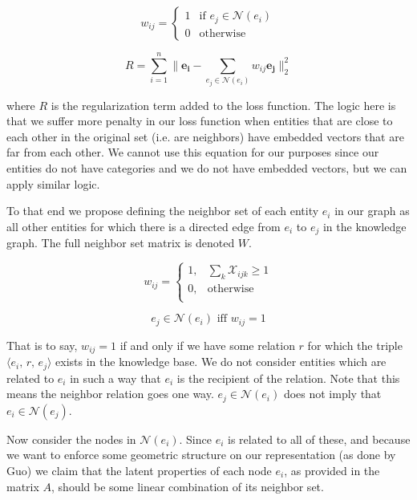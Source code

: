 \documentclass[pageno]{jpaper}
\begin{document}
$$
w_{ij} =
\begin{cases}
    1 & \text{if } e_j \in \mathcal{N}(e_i) \\
    0 & \text{otherwise}
\end{cases}
$$

$$R = \sum_{i=1}^n \lVert \mathbf{e_i} - \sum_{e_j \in \mathcal{N}(e_i)} w_{ij}
\mathbf{e_j} \rVert_2^2$$

where $R$ is the regularization term added to the loss function. The logic here
is that we suffer more penalty in our loss function when entities that are close
to each other in the original set (i.e. are neighbors) have embedded vectors
that are far from each other. We cannot use this equation for our purposes since
our entities do not have categories and we do not have embedded vectors, but we
can apply similar logic.

To that end we propose defining the neighbor set of each entity $e_i$ in our graph
as all other entities for which there is a directed edge from $e_i$ to $e_j$ in
the knowledge graph. The full neighbor set matrix is denoted $W$.

\begin{equation}
    \label{eq: new wij}
    w_{ij} =
    \begin{cases}
        1, & \sum_k \mathcal{X}_{ijk} \geq 1 \\
        0, & \text{otherwise} \\
    \end{cases}
\end{equation}

\begin{equation}
    \label{eq: new neighbor set}
    e_j \in \mathcal{N}(e_i) \text{ iff } w_{ij} = 1
\end{equation}

That is to say, $w_{ij} = 1$ if and only if we have some relation $r$ for which
the triple $\langle e_i,\,r,\,e_j \rangle$ exists in the knowledge base. We do
not consider entities which are related to $e_i$ in such a way that $e_i$ is the
recipient of the relation. Note that this means the neighbor relation goes one
way. $e_j \in \mathcal{N}(e_i)$ does not imply that $e_i \in \mathcal{N}(e_j)$.

Now consider the nodes in $\mathcal{N}(e_i)$. Since $e_i$ is related to all of
these, and because we want to enforce some geometric structure on our
representation (as done by Guo) we claim that the latent properties of each node
$e_i$, as provided in the matrix $A$, should be some linear combination of its
neighbor set.
\end{document}
